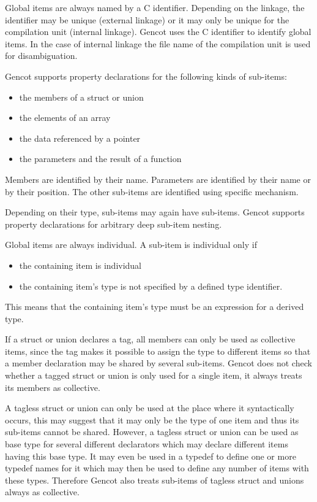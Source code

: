 Global items are always named by a C identifier. Depending on the linkage, the identifier may be unique (external linkage)
or it may only be unique for the compilation unit (internal linkage). Gencot uses the C identifier to identify global 
items. In the case of internal linkage the file name of the compilation unit is used for disambiguation.

Gencot supports property declarations for the following kinds of sub-items:
\begin{itemize}
\item the members of a struct or union
\item the elements of an array
\item the data referenced by a pointer
\item the parameters and the result of a function
\end{itemize}
Members are identified by their name. Parameters are identified by their name or by their position. The other
sub-items are identified using specific mechanism.

Depending on their type, sub-items may again have sub-items. Gencot supports property declarations for arbitrary
deep sub-item nesting.

Global items are always individual. A sub-item is individual only if
\begin{itemize}
\item the containing item is individual
\item the containing item's type is not specified by a defined type identifier.
\end{itemize}
This means that the containing item's type must be an expression for a derived type.

If a struct or union declares a tag, all members can only be used as collective items, since the tag makes it possible
to assign the type to different items so that a member declaration may be shared by several sub-items. Gencot does
not check whether a tagged struct or union is only used for a single item, it always treats its members as collective.

A tagless struct or union can only be used at the place where it syntactically occurs, this may suggest that it may 
only be the type of one item and thus its sub-items cannot be shared. However, a tagless struct or union can be used as 
base type for several different declarators which may declare different items having this base type. It may even be
used in a typedef to define one or more typedef names for it which may then be used to define any number of items
with these types. Therefore Gencot also treats sub-items of tagless struct and unions always as collective.

